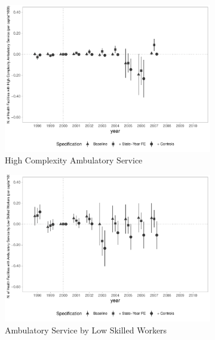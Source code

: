\begin{figure}[h]
\begin{center}
\begin{subfigure}{0.24\textwidth}
    \end{subfigure}
    \begin{subfigure}{0.24\textwidth}
        \centering
        \caption{\tiny High Complexity Ambulatory Service}\label{fig:infra_c}
        \includegraphics[width=\textwidth]{plots/infra/sia_ncnes_amb_hc_mun_pcapita_dist_ec29_baseline_dist_ec29_baseline_full.pdf}
    \end{subfigure}
    \begin{subfigure}{0.24\textwidth}
        \centering
        \caption{\tiny Ambulatory Service by Low Skilled Workers}\label{fig:infra_d}
        \includegraphics[width=\textwidth]{plots/infra/sia_ncnes_low_skill_mun_pcapita_dist_ec29_baseline_dist_ec29_baseline_full.pdf}
    \end{subfigure}
    \begin{subfigure}{0.24\textwidth}

\end{subfigure}
\end{center}
\end{figure}
